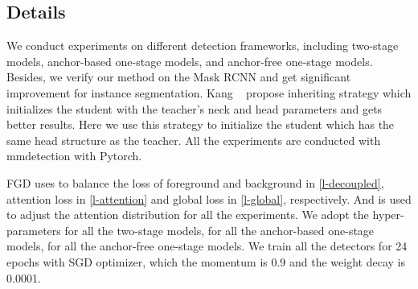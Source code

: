 \documentclass[10pt,twocolumn,letterpaper]{article}
\begin{document}
\subsection{Details}
We conduct experiments on different detection frameworks, including two-stage models\cite{ren2015faster}, anchor-based one-stage models\cite{lin2017focal}, and anchor-free one-stage models\cite{yang2019reppoints,tian2019fcos}. Besides, we verify our method on the Mask RCNN\cite{he2017mask} and get significant improvement for instance segmentation. Kang \etal~\cite{kang2021instance} propose inheriting strategy which initializes the student with the teacher's neck and head parameters and gets better results. Here we use this strategy to initialize the student which has the same head structure as the teacher. All the experiments are conducted with mmdetection\cite{mmdetection} with Pytorch\cite{paszke2019pytorch}.

FGD uses  to balance the loss of foreground and background in \cref{l-decoupled}, attention loss in \cref{l-attention} and global loss in \cref{l-global}, respectively. And  is used to adjust the attention distribution for all the experiments. We adopt the hyper-parameters for all the two-stage models,  for all the anchor-based one-stage models,  for all the anchor-free one-stage models. We train all the detectors for 24 epochs with SGD optimizer, which the momentum is 0.9 and the weight decay is 0.0001.
\end{document}
